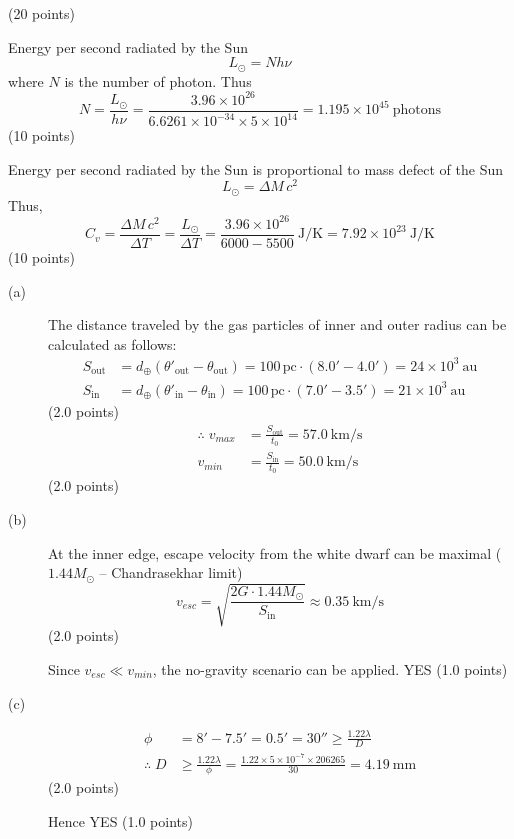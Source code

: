 \begin{description}
  \hfill(20 points)
\item[e.] Energy per second radiated by the Sun
  \[
    L_\odot = Nh\nu
  \]
  where $N$ is the number of photon. Thus
  \[
    N = \frac{L_\odot}{h\nu}
      = \frac{3.96\times10^{26}}{6.6261\times10^{-34}\times 5\times10^{14}}
      = 1.195\times10^{45}\ \text{photons}
  \]
  \hfill(10 points)
\item[f.] Energy per second radiated by the Sun is proportional to mass defect
  of the Sun
  \[
    L_\odot = \Delta M\,c^2
  \]
  Thus,
  \[
    C_v = \frac{\Delta M\,c^2}{\Delta T} = \frac{L_\odot}{\Delta T}
        = \frac{3.96\times10^{26}}{6000 - 5500}\ \mathrm{J/K}
        = 7.92\times10^{23}\ \mathrm{J/K}
  \]
  \hfill(10 points)
\end{description}

\begin{description}
\item[(a)] The distance traveled by the gas particles of inner and outer radius
  can be calculated as follows:
  \begin{align*}
    S_{\mathrm{out}} &= d_\oplus(\theta'_{\mathrm{out}} - \theta_{\mathrm{out}})
      = 100\,\mathrm{pc}\cdot(8.0' - 4.0') = 24\times10^{3}\ \mathrm{au} \\
    S_{\mathrm{in}} &= d_\oplus(\theta'_{\mathrm{in}} - \theta_{\mathrm{in}})
      = 100\,\mathrm{pc}\cdot(7.0' - 3.5') = 21\times10^{3}\ \mathrm{au}
  \end{align*}
  \hfill(2.0 points)
  \begin{align*}
    \therefore\; v_{max} &= \frac{S_{\mathrm{out}}}{t_0} = 57.0\ \mathrm{km/s} \\
    v_{min} &= \frac{S_{\mathrm{in}}}{t_0} = 50.0\ \mathrm{km/s}
  \end{align*}
  \hfill(2.0 points)
\item[(b)] At the inner edge, escape velocity from the white dwarf can be
  maximal ($1.44M_\odot$ -- Chandrasekhar limit)
  \[
    v_{esc} = \sqrt{\frac{2G\cdot1.44M_\odot}{S_{\mathrm{in}}}}
      \approx 0.35\ \mathrm{km/s}
  \]
  \hfill(2.0 points)

  Since $v_{esc} \ll v_{min}$, the no-gravity scenario can be applied. YES
  \hfill(1.0 points)
\item[(c)]
  \begin{align*}
    \phi &= 8' - 7.5' = 0.5' = 30'' \ge \frac{1.22\lambda}{D} \\
    \therefore\; D &\ge \frac{1.22\lambda}{\phi}
      = \frac{1.22\times5\times10^{-7}\times206265}{30} = 4.19\ \mathrm{mm}
  \end{align*}
  \hfill(2.0 points)

  Hence YES
  \hfill(1.0 points)
\end{description}

